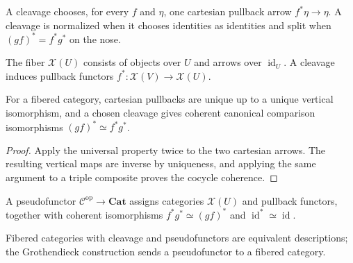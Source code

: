 \begin{definition}[cleavage]\label{fga-def-3-8}
A cleavage chooses, for every $f$ and $\eta$, one cartesian pullback arrow
$f^*\eta\to\eta$.  A cleavage is normalized when it chooses identities as
identities and split when $(gf)^*=f^*g^*$ on the nose.
\end{definition}
\begin{definition}\label{fga-def-3-9}
The fiber $\mathcal X(U)$ consists of objects over $U$ and arrows over
$\operatorname{id}_U$.  A cleavage induces pullback functors $f^*:
\mathcal X(V)\to\mathcal X(U)$.
\end{definition}
\begin{proposition}\label{fga-prop-3-11}
For a fibered category, cartesian pullbacks are unique up to a unique vertical
isomorphism, and a chosen cleavage gives coherent canonical comparison
isomorphisms $(gf)^*\simeq f^*g^*$.
\end{proposition}
\begin{proof}
Apply the universal property twice to the two cartesian arrows.  The resulting
vertical maps are inverse by uniqueness, and applying the same argument to a
triple composite proves the cocycle coherence.
\end{proof}

\begin{definition}[pseudofunctor]\label{fga-def-3-12}
A pseudofunctor $\mathcal C^{\mathrm{op}}\to\mathbf{Cat}$ assigns categories
$\mathcal X(U)$ and pullback functors, together with coherent isomorphisms
$f^*g^*\simeq(gf)^*$ and $\operatorname{id}^*\simeq\operatorname{id}$.
\end{definition}
\begin{proposition}\label{fga-prop-3-13}
Fibered categories with cleavage and pseudofunctors are equivalent descriptions;
the Grothendieck construction sends a pseudofunctor to a fibered category.
\end{proposition}


